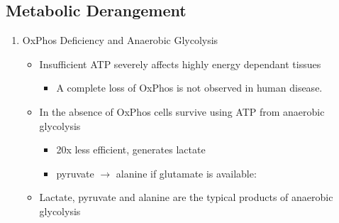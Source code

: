 \documentclass{scrartcl}
\begin{document}
\subsection{Metabolic Derangement}
\label{sec:org2059f05}
\begin{enumerate}
\item OxPhos Deficiency and Anaerobic Glycolysis
\label{sec:org8af68a5}
\begin{itemize}
\item Insufficient ATP severely affects highly energy dependant tissues
\begin{itemize}
\item A complete loss of OxPhos is not observed in human disease.
\end{itemize}
\item In the absence of OxPhos cells survive using ATP from anaerobic glycolysis
\begin{itemize}
\item 20x less efficient, generates lactate
\item pyruvate \(\to\) alanine if glutamate is available:
\end{itemize}
\item Lactate, pyruvate and alanine are the typical products of anaerobic glycolysis
\end{itemize}


\end{enumerate}
\end{document}
